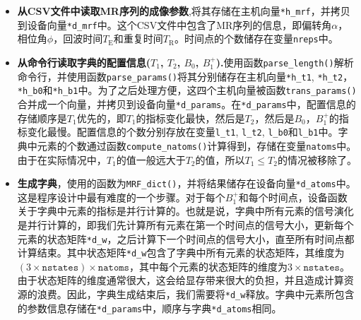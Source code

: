 \begin{itemize}
\item \textbf{从CSV文件中读取MR序列的成像参数},将其存储在主机向量\texttt{*h\_mrf}，并拷贝到设备向量\texttt{*d\_mrf}中。这个CSV文件中包含了MR序列的信息，即偏转角$\alpha$，相位角$\phi$，回波时间$T_\mathrm{E}$和重复时间$T_\mathrm{R}$。时间点的个数储存在变量\texttt{nreps}中。

\item \textbf{从命令行读取字典的配置信息($T_1$, $T_2$, $B_0$, $B_1^+$).}使用函数\texttt{parse\_length()}解析命令行，并使用函数\texttt{parse\_params()}将其分别储存在主机向量\texttt{*h\_t1}, \texttt{*h\_t2}，\texttt{*h\_b0}和\texttt{*h\_b1}中。为了之后处理方便，这四个主机向量被函数\texttt{trans\_params()}合并成一个向量，并拷贝到设备向量\texttt{*d\_params}。在\texttt{*d\_params}中，配置信息的存储顺序是$T_1$优先的，即$T_1$的指标变化最快，然后是$T_2$，然后是$B_0$，$B_1^+$的指标变化最慢。配置信息的个数分别存放在变量\texttt{l\_t1}, \texttt{l\_t2}, \texttt{l\_b0}和\texttt{l\_b1}中。字典中元素的个数通过函数\texttt{compute\_natoms()}计算得到，存储在变量\texttt{natoms}中。由于在实际情况中，$T_1$的值一般远大于$T_2$的值，所以$T_1 \le T_2$的情况被移除了。

\item \textbf{生成字典}，使用的函数为\texttt{MRF\_dict()}，并将结果储存在设备向量\texttt{*d\_atoms}中。这是程序设计中最有难度的一个步骤。对于每个$B_1^+$和每个时间点，设备函数关于字典中元素的指标是并行计算的。也就是说，字典中所有元素的信号演化是并行计算的，即我们先计算所有元素在第一个时间点的信号大小，更新每个元素的状态矩阵\texttt{*d\_w}，之后计算下一个时间点的信号大小，直至所有时间点都计算结束。其中状态矩阵\texttt{*d\_w}包含了字典中所有元素的状态矩阵，其维度为$(3\times \texttt{nstates})\times \texttt{natoms}$，其中每个元素的状态矩阵的维度为$3\times \texttt{nstates}$。由于状态矩阵的维度通常很大，这会给显存带来很大的负担，并且造成计算资源的浪费。因此，字典生成结束后，我们需要将\texttt{*d\_w}释放。字典中元素所包含的参数信息存储在\texttt{*d\_params}中，顺序与字典\texttt{*d\_atoms}相同。


\end{itemize}
